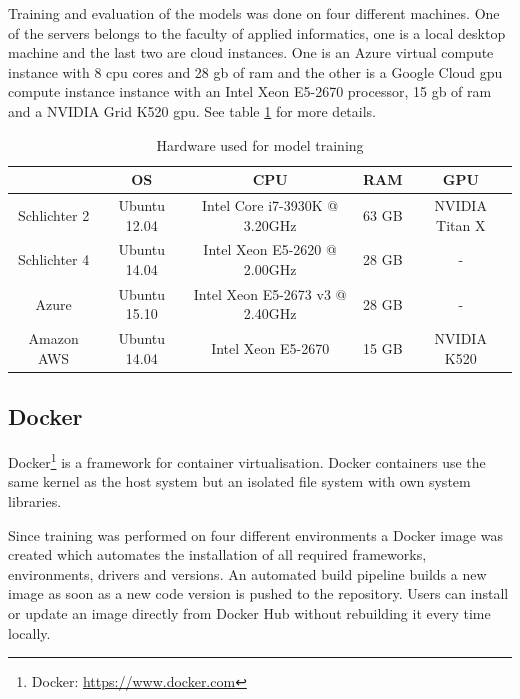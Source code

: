 Training and evaluation of the models was done on four different machines. One of the servers belongs to the faculty of applied informatics, one is a local desktop machine and the last two are cloud instances. One is an Azure virtual compute instance with 8 \gls{cpu} cores and 28 \gls{gb} of \gls{ram} and the other is a Google Cloud \gls{gpu} compute instance instance with an Intel Xeon E5-2670 processor, 15 \gls{gb} of \gls{ram} and a NVIDIA Grid K520 \gls{gpu}. See table \ref{tab:05_usedHardware} for more details.
\begin{table}[hbt]
	\centering
	\caption{Hardware used for model training}
	\label{tab:05_usedHardware}
	\begin{tabular}{@{}ccccc@{}}
		\toprule
		\multicolumn{1}{c}{\textbf{}}    & \multicolumn{1}{c}{\textbf{OS}} & \multicolumn{1}{c}{\textbf{CPU}}                    & \multicolumn{1}{c}{\textbf{RAM}} & \multicolumn{1}{c}{\textbf{GPU}}     \\ \midrule
		Schlichter 2 & Ubuntu 12.04              & Intel Core i7-3930K @ 3.20GHz   & 63 GB        & NVIDIA Titan X \\ \midrule
		Schlichter 4 & Ubuntu 14.04              & Intel Xeon E5-2620 @ 2.00GHz    & 28 GB        & -                \\ \midrule
		Azure        & Ubuntu 15.10              & Intel Xeon E5-2673 v3 @ 2.40GHz & 28 GB        & -                \\ \midrule
		Amazon AWS   & Ubuntu 14.04              & Intel Xeon E5-2670              & 15 GB        & NVIDIA K520 \\ \bottomrule
	\end{tabular}
\end{table}


\subsection{Docker}

Docker\footnote{Docker: \hyperlink{https://www.docker.com}{https://www.docker.com}} is a framework for container virtualisation. Docker containers use the same kernel as the host system but an isolated file system with own system libraries. 


Since training was performed on four different environments a Docker image was created which automates the installation of all required frameworks, environments, drivers and versions. An automated build pipeline builds a new image as soon as a new code version is pushed to the repository. Users can install or update an image directly from Docker Hub without rebuilding it every time locally.

